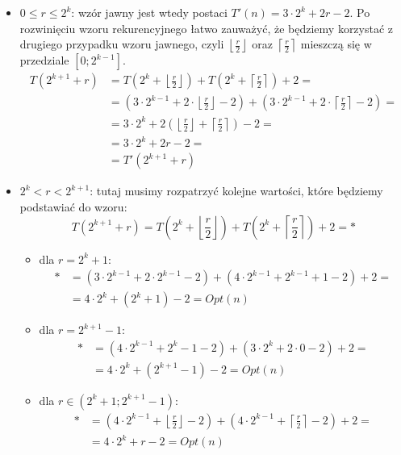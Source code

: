 \documentclass[a4paper,12pt]{article}
\newcommand{\floor}[1]{\left\lfloor #1 \right\rfloor}
\newcommand{\ceil}[1]{\left\lceil #1 \right\rceil}
\begin{document}
\begin{itemize}
\item $0 \leq r \leq 2^k$: wzór jawny jest wtedy postaci $T'(n) = 3\cdot 2^k + 2r - 2$. Po rozwinięciu wzoru rekurencyjnego łatwo zauważyć, że będziemy korzystać z drugiego przypadku wzoru jawnego, czyli $\floor{\frac{r}{2}}$ oraz $\ceil{\frac{r}{2}}$ mieszczą się w przedziale $\left[ 0; 2^{k-1} \right]$.
$$
\begin{aligned}
T(2^{k+1}+r) &= T \left( 2^k + \floor{\frac{r}{2}} \right) + T \left( 2^k + \ceil{\frac{r}{2}} \right) + 2 = \\
		   &= \left(3 \cdot 2^{k-1} + 2 \cdot  \floor{\frac{r}{2}} - 2 \right) +  \left(3 \cdot 2^{k-1} + 2 \cdot  \ceil{\frac{r}{2}} - 2 \right) = \\
		   &= 3 \cdot 2^k + 2 \left( \floor{\frac{r}{2}} + \ceil{\frac{r}{2}} \right) - 2 =\\
		   &= 3 \cdot 2^k + 2r - 2 = \\
		   &= T'(2^{k+1} + r)
\end{aligned}
$$
\item $2^k < r < 2^{k+1}$: tutaj musimy rozpatrzyć kolejne wartości, które będziemy podstawiać do wzoru:
$$ T(2^{k+1}+r) = T \left( 2^k + \floor{\frac{r}{2}} \right) + T \left( 2^k + \ceil{\frac{r}{2}} \right) + 2 = *$$
\begin{itemize}
\item dla $r = 2^k + 1$:
$$
\begin{aligned}
* &= \left( 3 \cdot 2^{k-1} + 2 \cdot 2^{k-1} - 2 \right) + \left( 4 \cdot 2^{k-1} + 2^{k-1} + 1 - 2 \right) + 2 =\\
   &= 4 \cdot 2^k + \left( 2^k + 1 \right) - 2 = Opt(n)
\end{aligned}
$$
\item dla $r = 2^{k+1} - 1$:
$$
\begin{aligned}
* &=  \left( 4 \cdot 2^{k-1} + 2^{k} - 1 - 2 \right) + \left( 3 \cdot 2^k + 2\cdot 0 - 2 \right) + 2 =\\
   &= 4 \cdot 2^k + \left( 2^{k+1} - 1 \right) -2 = Opt(n)
\end{aligned}
$$
\item dla $r \in \left(2^{k} + 1; 2^{k+1} -1 \right)$:
$$
\begin{aligned}
* &=  \left( 4 \cdot 2^{k-1} + \floor{\frac{r}{2}} - 2 \right) + \left( 4 \cdot 2^{k-1} + \ceil{\frac{r}{2}} - 2 \right) + 2 =\\
   &= 4 \cdot 2^k + r - 2 = Opt(n)
\end{aligned}
$$
\end{itemize}
\end{itemize}
\end{document}
